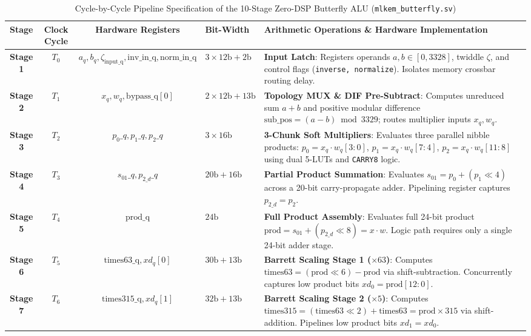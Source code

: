 \begin{table}[!t]
\caption{Cycle-by-Cycle Pipeline Specification of the 10-Stage Zero-DSP Butterfly ALU (\texttt{mlkem\_butterfly.sv})}
\label{tab:butterfly_pipeline_stages}
\centering
\footnotesize
\begin{tabular*}{\textwidth}{@{\extracolsep{\fill}} ccclp{7.8cm} @{}}
\toprule
\textbf{Stage} & \textbf{Clock Cycle} & \textbf{Hardware Registers} & \textbf{Bit-Width} & \textbf{Arithmetic Operations \& Hardware Implementation} \\
\midrule
\textbf{Stage 1} & $T_0$ & $a_q, b_q, \zeta_{\text{input\_q}}, \text{inv\_in\_q}, \text{norm\_in\_q}$ & $3 \times 12\text{b} + 2\text{b}$ & \textbf{Input Latch}: Registers operands $a, b \in [0, 3328]$, twiddle $\zeta$, and control flags (\texttt{inverse, normalize}). Isolates memory crossbar routing delay. \\
\textbf{Stage 2} & $T_1$ & $x_q, w_q, \text{bypass\_q}[0]$ & $2 \times 12\text{b} + 13\text{b}$ & \textbf{Topology MUX \& DIF Pre-Subtract}: Computes unreduced sum $a+b$ and positive modular difference $\text{sub\_pos} = (a-b) \bmod 3329$; routes multiplier inputs $x_q, w_q$. \\
\textbf{Stage 3} & $T_2$ & $p_0\_q, p_1\_q, p_2\_q$ & $3 \times 16\text{b}$ & \textbf{3-Chunk Soft Multipliers}: Evaluates three parallel nibble products: $p_0 = x_q \cdot w_q[3:0]$, $p_1 = x_q \cdot w_q[7:4]$, $p_2 = x_q \cdot w_q[11:8]$ using dual 5-LUTs and \texttt{CARRY8} logic. \\
\textbf{Stage 4} & $T_3$ & $s_{01}\_q, p_{2\_d}\_q$ & $20\text{b} + 16\text{b}$ & \textbf{Partial Product Summation}: Evaluates $s_{01} = p_0 + (p_1 \ll 4)$ across a 20-bit carry-propagate adder. Pipelining register captures $p_{2\_d} = p_2$. \\
\textbf{Stage 5} & $T_4$ & $\text{prod\_q}$ & $24\text{b}$ & \textbf{Full Product Assembly}: Evaluates full 24-bit product $\text{prod} = s_{01} + (p_{2\_d} \ll 8) = x \cdot w$. Logic path requires only a single 24-bit adder stage. \\
\textbf{Stage 6} & $T_5$ & $\text{times63\_q}, xd_q[0]$ & $30\text{b} + 13\text{b}$ & \textbf{Barrett Scaling Stage 1 ($\times 63$)}: Computes $\text{times63} = (\text{prod} \ll 6) - \text{prod}$ via shift-subtraction. Concurrently captures low product bits $xd_0 = \text{prod}[12:0]$. \\
\textbf{Stage 7} & $T_6$ & $\text{times315\_q}, xd_q[1]$ & $32\text{b} + 13\text{b}$ & \textbf{Barrett Scaling Stage 2 ($\times 5$)}: Computes $\text{times315} = (\text{times63} \ll 2) + \text{times63} = \text{prod} \times 315$ via shift-addition. Pipelines low product bits $xd_1 = xd_0$. \\

\end{tabular*}
\end{table}
